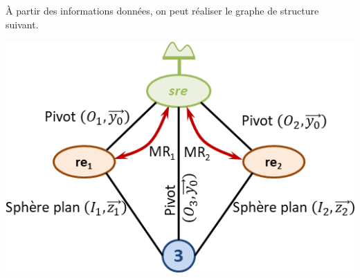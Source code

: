 \documentclass[10pt,fleqn]{article} %
\begin{document}
\subparagraph{}
À partir des informations données, on peut réaliser le graphe de structure suivant. 

\begin{center}
\includegraphics[width=.7\linewidth]{images/fig_02}
\end{center}
\end{document}
